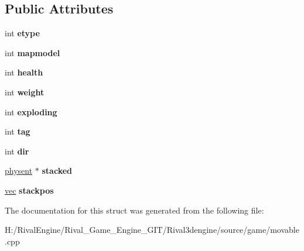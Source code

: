 \subsection*{Public Attributes}
\begin{DoxyCompactItemize}
\item 
\mbox{\label{structgame_1_1movable_ad06ce07e5ae24f30782600ea8fab3deb}} 
int {\bfseries etype}
\item 
\mbox{\label{structgame_1_1movable_ad17f4106e30913ae386c5157a7151a67}} 
int {\bfseries mapmodel}
\item 
\mbox{\label{structgame_1_1movable_a7dd236f47bb5d8d252e922c90fd5d421}} 
int {\bfseries health}
\item 
\mbox{\label{structgame_1_1movable_a39435eb99d55e93d6cd636515d35a085}} 
int {\bfseries weight}
\item 
\mbox{\label{structgame_1_1movable_aef6824a4a9920d280f20831bedff287c}} 
int {\bfseries exploding}
\item 
\mbox{\label{structgame_1_1movable_a4de8dd394bb2f5f2e8691476cb2514c7}} 
int {\bfseries tag}
\item 
\mbox{\label{structgame_1_1movable_a9f19de2d99fd82895dcd0ef2eadb18da}} 
int {\bfseries dir}
\item 
\mbox{\label{structgame_1_1movable_aad02972415ab8490876ccaf37149fa44}} 
\hyperlink{structphysent}{physent} $\ast$ {\bfseries stacked}
\item 
\mbox{\label{structgame_1_1movable_ad3e079e8d6cdd55882bd1f0a52714050}} 
\hyperlink{structvec}{vec} {\bfseries stackpos}
\end{DoxyCompactItemize}


The documentation for this struct was generated from the following file\+:\begin{DoxyCompactItemize}
\item 
H\+:/\+Rival\+Engine/\+Rival\+\_\+\+Game\+\_\+\+Engine\+\_\+\+G\+I\+T/\+Rival3dengine/source/game/movable.\+cpp\end{DoxyCompactItemize}
